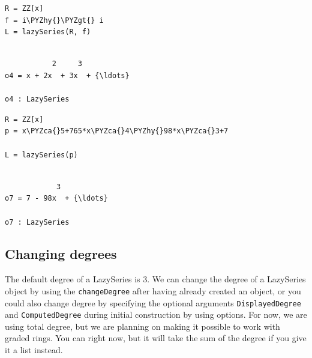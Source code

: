 \documentclass[11pt]{article}
\makeatletter
\def\PYZca{\char`\^}
\def\PYZgt{\char`\>}
\def\PYZhy{\char`\-}
\newcommand{\boxspacing}{\kern\kvtcb@left@rule\kern\kvtcb@boxsep}
\newcommand{\prompt}[4]{
        {\ttfamily\llap{{\color{#2}[#3]:\hspace{3pt}#4}}\vspace{-\baselineskip}}
    }
\makeatother
\begin{document}
    \begin{tcolorbox}[breakable, size=fbox, boxrule=1pt, pad at break*=1mm,colback=cellbackground, colframe=cellborder]
\prompt{In}{incolor}{4}{\boxspacing}
\begin{Verbatim}[commandchars=\\\{\}]
R = ZZ[x]
f = i\PYZhy{}\PYZgt{} i
L = lazySeries(R, f)
\end{Verbatim}
\end{tcolorbox}

    \begin{Verbatim}[commandchars=\\\{\}]

           2     3
o4 = x + 2x  + 3x  + {\ldots}

o4 : LazySeries
    \end{Verbatim}

    \begin{tcolorbox}[breakable, size=fbox, boxrule=1pt, pad at break*=1mm,colback=cellbackground, colframe=cellborder]
\prompt{In}{incolor}{7}{\boxspacing}
\begin{Verbatim}[commandchars=\\\{\}]
R = ZZ[x]
p = x\PYZca{}5+765*x\PYZca{}4\PYZhy{}98*x\PYZca{}3+7

L = lazySeries(p)
\end{Verbatim}
\end{tcolorbox}

    \begin{Verbatim}[commandchars=\\\{\}]

            3
o7 = 7 - 98x  + {\ldots}

o7 : LazySeries
    \end{Verbatim}

    \hypertarget{changing-degrees}{%
\subsection{Changing degrees}\label{changing-degrees}}

The default degree of a LazySeries is 3. We can change the degree of a
LazySeries object by using the \texttt{changeDegree} after having
already created an object, or you could also change degree by specifying
the optional arguments \texttt{DisplayedDegree} and
\texttt{ComputedDegree} during initial construction by using options.
For now, we are using total degree, but we are planning on making it
possible to work with graded rings. You can right now, but it will take
the sum of the degree if you give it a list instead.
\end{document}
